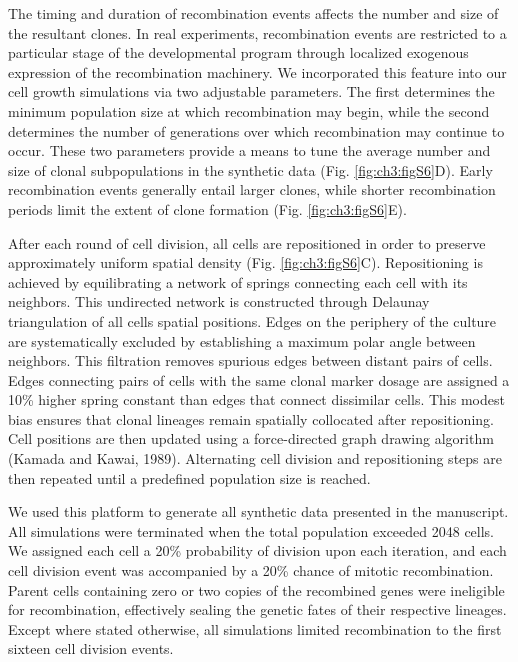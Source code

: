 The timing and duration of recombination events affects the number and size of the resultant clones. In real experiments, recombination events are restricted to a particular stage of the developmental program through localized exogenous expression of the recombination machinery. We incorporated this feature into our cell growth simulations via two adjustable parameters. The first determines the minimum population size at which recombination may begin, while the second determines the number of generations over which recombination may continue to occur. These two parameters provide a means to tune the average number and size of clonal subpopulations in the synthetic data (Fig. \ref{fig:ch3:figS6}D). Early recombination events generally entail larger clones, while shorter recombination periods limit the extent of clone formation (Fig. \ref{fig:ch3:figS6}E).

After each round of cell division, all cells are repositioned in order to preserve approximately uniform spatial density (Fig. \ref{fig:ch3:figS6}C). Repositioning is achieved by equilibrating a network of springs connecting each cell with its neighbors. This undirected network is constructed through Delaunay triangulation of all cells spatial positions. Edges on the periphery of the culture are systematically excluded by establishing a maximum polar angle between neighbors. This filtration removes spurious edges between distant pairs of cells. Edges connecting pairs of cells with the same clonal marker dosage are assigned a 10\% higher spring constant than edges that connect dissimilar cells. This modest bias ensures that clonal lineages remain spatially collocated after repositioning. Cell positions are then updated using a force-directed graph drawing algorithm (Kamada and Kawai, 1989). Alternating cell division and repositioning steps are then repeated until a predefined population size is reached.

We used this platform to generate all synthetic data presented in the manuscript. All simulations were terminated when the total population exceeded 2048 cells. We assigned each cell a 20\% probability of division upon each iteration, and each cell division event was accompanied by a 20\% chance of mitotic recombination. Parent cells containing zero or two copies of the recombined genes were ineligible for recombination, effectively sealing the genetic fates of their respective lineages. Except where stated otherwise, all simulations limited recombination to the first sixteen cell division events.

